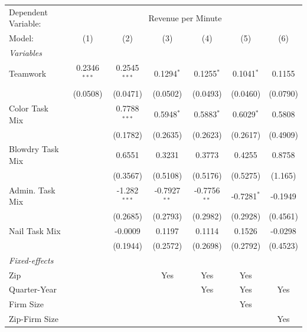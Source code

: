 
\begingroup
\centering
\begin{tabular}{lcccccc}
   \tabularnewline \midrule \midrule
   Dependent Variable: & \multicolumn{6}{c}{Revenue per Minute}\\
   Model:           & (1)            & (2)            & (3)            & (4)            & (5)           & (6)\\  
   \midrule
   \emph{Variables}\\
   Teamwork         & 0.2346$^{***}$ & 0.2545$^{***}$ & 0.1294$^{*}$   & 0.1255$^{*}$   & 0.1041$^{*}$  & 0.1155\\   
                    & (0.0508)       & (0.0471)       & (0.0502)       & (0.0493)       & (0.0460)      & (0.0790)\\   
   Color Task Mix   &                & 0.7788$^{***}$ & 0.5948$^{*}$   & 0.5883$^{*}$   & 0.6029$^{*}$  & 0.5808\\   
                    &                & (0.1782)       & (0.2635)       & (0.2623)       & (0.2617)      & (0.4909)\\   
   Blowdry Task Mix &                & 0.6551         & 0.3231         & 0.3773         & 0.4255        & 0.8758\\   
                    &                & (0.3567)       & (0.5108)       & (0.5176)       & (0.5275)      & (1.165)\\   
   Admin. Task Mix  &                & -1.282$^{***}$ & -0.7927$^{**}$ & -0.7756$^{**}$ & -0.7281$^{*}$ & -0.1949\\   
                    &                & (0.2685)       & (0.2793)       & (0.2982)       & (0.2928)      & (0.4561)\\   
   Nail Task Mix    &                & -0.0009        & 0.1197         & 0.1114         & 0.1526        & -0.0298\\   
                    &                & (0.1944)       & (0.2572)       & (0.2698)       & (0.2792)      & (0.4523)\\   
   \midrule
   \emph{Fixed-effects}\\
   Zip              &                &                & Yes            & Yes            & Yes           & \\  
   Quarter-Year     &                &                &                & Yes            & Yes           & Yes\\  
   Firm Size        &                &                &                &                & Yes           & \\  
   Zip-Firm Size    &                &                &                &                &               & Yes\\  

\end{tabular}
